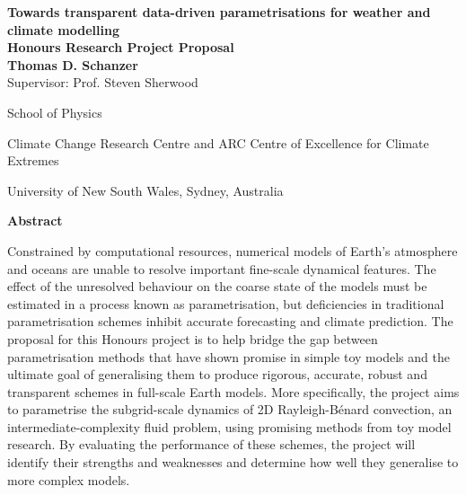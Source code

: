\documentclass[titlepage]{article}
\newcommand{\rb}{Rayleigh-B\'{e}nard}
\begin{document}
\begin{titlepage}
\begin{center}
    {\Huge \textbf{%
        Towards transparent data-driven parametrisations for weather and
        climate modelling
    }} \\
    \vspace{0.75cm}
    {\Large\textbf{Honours Research Project Proposal}} \\
    \vspace{0.75cm}
    {\Large\textbf{Thomas D. Schanzer}} \\
    \vspace{6pt}
    {\large Supervisor: Prof. Steven Sherwood} \\
    \vspace{0.75cm}
    {\large%
        School of Physics

        Climate Change Research Centre and
        ARC Centre of Excellence for Climate Extremes

        University of New South Wales, Sydney, Australia
    }
\end{center}
\vfill
\begin{center}
{\large\textbf{Abstract}}

\begin{minipage}{13cm}
    Constrained by computational resources, numerical models of Earth's
    atmosphere and oceans are unable to resolve important fine-scale dynamical
    features. The effect of the unresolved behaviour on the coarse state of the
    models must be estimated in a process known as parametrisation, but
    deficiencies in traditional parametrisation schemes inhibit accurate
    forecasting and climate prediction. The proposal for this Honours project
    is to help bridge the gap between parametrisation methods that have shown
    promise in simple toy models and the ultimate goal of generalising them to
    produce rigorous, accurate, robust and transparent schemes in full-scale
    Earth models. More specifically, the project aims to parametrise the
    subgrid-scale dynamics of 2D \rb{} convection, an intermediate-complexity
    fluid problem, using promising methods from toy model research. By
    evaluating the performance of these schemes, the project will identify
    their strengths and weaknesses and determine how well they generalise to
    more complex models.
\end{minipage}
\end{center}
\vfill
\renewcommand{\baselinestretch}{0.75}\normalsize
\tableofcontents
\renewcommand{\baselinestretch}{1.0}\normalsize
\end{titlepage}
\end{document}
